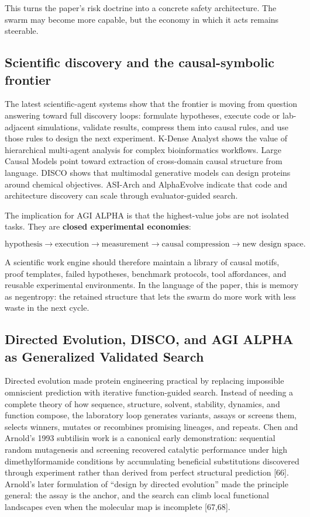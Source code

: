 This turns the paper's risk doctrine into a concrete safety
architecture. The swarm may become more capable, but the economy in
which it acts remains steerable.

\subsection{Scientific discovery and the causal-symbolic
frontier}\label{scientific-discovery-and-the-causal-symbolic-frontier}

The latest scientific-agent systems show that the frontier is moving
from question answering toward full discovery loops: formulate
hypotheses, execute code or lab-adjacent simulations, validate results,
compress them into causal rules, and use those rules to design the next
experiment. K-Dense Analyst shows the value of hierarchical multi-agent
analysis for complex bioinformatics workflows. Large Causal Models point
toward extraction of cross-domain causal structure from language. DISCO
shows that multimodal generative models can design proteins around
chemical objectives. ASI-Arch and AlphaEvolve indicate that code and
architecture discovery can scale through evaluator-guided search.

The implication for AGI ALPHA is that the highest-value jobs are not
isolated tasks. They are \textbf{closed experimental economies}:

\[
\text{hypothesis}
\rightarrow
\text{execution}
\rightarrow
\text{measurement}
\rightarrow
\text{causal compression}
\rightarrow
\text{new design space}.
\]

A scientific work engine should therefore maintain a library of causal
motifs, proof templates, failed hypotheses, benchmark protocols, tool
affordances, and reusable experimental environments. In the language of
the paper, this is memory as negentropy: the retained structure that
lets the swarm do more work with less waste in the next cycle.

\subsection{Directed Evolution, DISCO, and AGI ALPHA as Generalized
Validated
Search}\label{directed-evolution-disco-and-agi-alpha-as-generalized-validated-search}

Directed evolution made protein engineering practical by replacing
impossible omniscient prediction with iterative function-guided search.
Instead of needing a complete theory of how sequence, structure,
solvent, stability, dynamics, and function compose, the laboratory loop
generates variants, assays or screens them, selects winners, mutates or
recombines promising lineages, and repeats. Chen and Arnold's 1993
subtilisin work is a canonical early demonstration: sequential random
mutagenesis and screening recovered catalytic performance under high
dimethylformamide conditions by accumulating beneficial substitutions
discovered through experiment rather than derived from perfect
structural prediction {[}66{]}. Arnold's later formulation of ``design
by directed evolution'' made the principle general: the assay is the
anchor, and the search can climb local functional landscapes even when
the molecular map is incomplete {[}67,68{]}.

